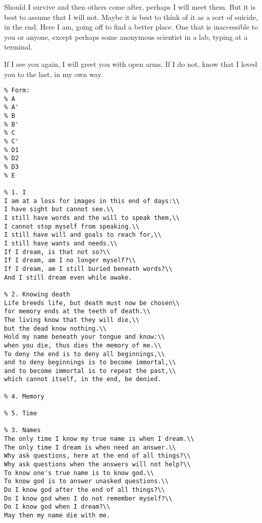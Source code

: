 Should I survive and then others come after, perhaps I will meet them. But it is best to assume that I will not. Maybe it is best to think of it as a sort of suicide, in the end. Here I am, going off to find a better place. One that is inaccessible to you or anyone, except perhaps some anonymous scientist in a lab, typing at a terminal.

If I see you again, I will greet you with open arms. If I do not, know that I loved you to the last, in my own way.

\begin{verbatim}
% Form:
% A
% A'
% B
% B'
% C
% C'
% D1
% D2
% D3
% E

% 1. I
I am at a loss for images in this end of days:\\
I have sight but cannot see.\\
I still have words and the will to speak them,\\
I cannot stop myself from speaking.\\
I still have will and goals to reach for,\\
I still have wants and needs.\\
If I dream, is that not so?\\
If I dream, am I no longer myself?\\
If I dream, am I still buried beneath words?\\
And I still dream even while awake.

% 2. Knowing death
Life breeds life, but death must now be chosen\\
for memory ends at the teeth of death.\\
The living know that they will die,\\
but the dead know nothing.\\
Hold my name beneath your tongue and know:\\
when you die, thus dies the memory of me.\\
To deny the end is to deny all beginnings,\\
and to deny beginnings is to become immortal,\\
and to become immortal is to repeat the past,\\
which cannot itself, in the end, be denied.

% 4. Memory

% 5. Time

% 3. Names
The only time I know my true name is when I dream.\\
The only time I dream is when need an answer.\\
Why ask questions, here at the end of all things?\\
Why ask questions when the answers will not help?\\
To know one's true name is to know god.\\
To know god is to answer unasked questions.\\
Do I know god after the end of all things?\\
Do I know god when I do not remember myself?\\
Do I know god when I dream?\\
May then my name die with me.


\end{verbatim}
